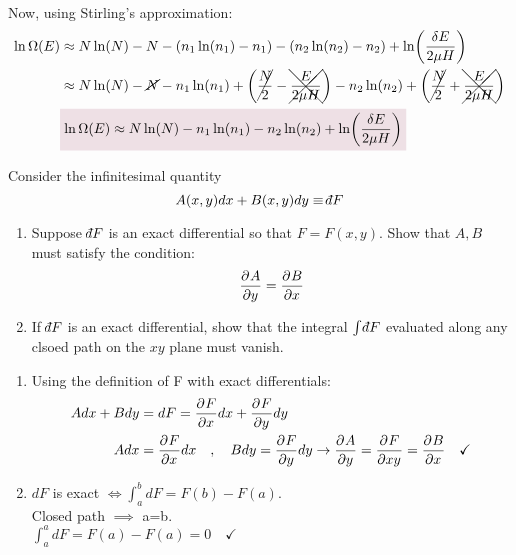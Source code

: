 \documentclass{article}
\def\dbar{{\mathchar'26\mkern-12mu d}} %
\begin{document}
\begin{problem}[Reif 2.4]
\begin{enumerate}[label=\alph*)]
            \\ Now, using Stirling's approximation: 
            \begin{align*}
                \ln\Omega(E)&\approx N\ln(N)-N-(n_1\ln(n_1)-n_1)-(n_2\ln(n_2)-n_2)+\ln(\frac{\delta E}{2\mu H})
                \\
                &\approx N\ln(N)-\cancel{N}-n_1\ln(n_1)+\qty(\cancel{\frac{N}{2}}-\xcancel{\frac{E}{2\mu H}})-n_2\ln(n_2)+\qty(\cancel{\frac{N}{2}}+\xcancel{\frac{E}{2\mu H}})
                \\
                &\coloredanswer{\ln\Omega(E)\approx N\ln(N)-n_1\ln(n_1)-n_2\ln(n_2)+\ln(\frac{\delta E}{2\mu H})}
            \end{align*}
        \end{enumerate}
    \end{problem}\newpage
    \begin{problem}[Reif 2.5]
        Consider the infinitesimal quantity $$A(x,y)dx+B(x,y)dy\equiv\dbar F$$
        \begin{enumerate}[label=(\alph*)]
            \item Suppose $\dbar F$ is an exact differential so that $F=F(x,y)$. Show that $A,B$ must satisfy the condition: $$\pder{A}{y}=\pder{B}{x}$$
            \item If $\dbar F$ is an exact differential, show that the integral $\int \dbar F$ evaluated along any clsoed path on the $xy$ plane must vanish.
        \end{enumerate}
        \answerline
        \begin{enumerate}[label=\alph*)]
            \item Using the definition of F with exact differentials:
            \begin{align*}
                Adx+Bdy&=dF=\pder{F}{x}dx+\pder{F}{y}dy
                \\
                Adx&=\pder{F}{x}dx 
                \quad,\quad
                Bdy=\pder{F}{y}dy
                \rightarrow
            \pder{A}{y}=\pder{F}{xy}=\pder{B}{x}\quad\checkmark
            \end{align*}
            \item $dF$ is exact $\iff\int_a^bdF=F(b)-F(a)$. 
            \\[0.25 cm]
            Closed path $\implies$ a=b.
            \\[0.25 cm]
            $\int_a^adF=F(a)-F(a)=0\quad\checkmark$
        \end{enumerate}
    \end{problem}\newpage
\end{document}
